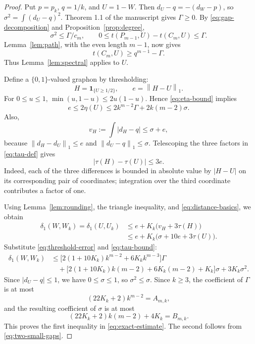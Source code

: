 \documentclass[11pt]{article}
\theoremstyle{remark}
\newcommand{\ind}{\mathbf{1}}
\newcommand{\norm}[1]{\left\lVert #1\right\rVert}
\begin{document}
\begin{proof}
Put $p=p_k$, $q=1/k$, and $U=1-W$.
Then $d_U-q=-(d_W-p)$, so $\sigma^2=\int(d_U-q)^2$.
Theorem 1.1 of the manuscript gives $\Gamma\geq0$.
By \eqref{eq:gap-decomposition} and Proposition~\ref{prop:degree},
\begin{equation}\label{eq:two-small-gaps}
 \sigma^2\leq\Gamma/c_m,
 \qquad 0\leq t(P_{m-1},U)-t(C_m,U)\leq\Gamma.
\end{equation}
Lemma~\ref{lem:path}, with the even length $m-1$, now gives
\[
 t(C_m,U)\geq q^{m-1}-\Gamma.
\]
Thus Lemma~\ref{lem:spectral} applies to $U$.

Define a $\{0,1\}$-valued graphon by thresholding:
\[
 H=\ind_{\{U\geq1/2\}},\qquad e=\norm{H-U}_1.
\]
For $0\leq u\leq1$,
$\min(u,1-u)\leq2u(1-u)$. Hence \eqref{eq:eta-bound} implies
\begin{equation}\label{eq:threshold-error}
 e\leq2\eta(U)
 \leq2k^{m-2}\Gamma+2k(m-2)\sigma.
\end{equation}
Also,
\begin{equation}\label{eq:threshold-degrees}
 v_H:=\int|d_H-q|\leq\sigma+e,
\end{equation}
because $\norm{d_H-d_U}_1\leq e$ and
$\norm{d_U-q}_1\leq\sigma$.
Telescoping the three factors in \eqref{eq:tau-def} gives
\begin{equation}\label{eq:threshold-triples}
 |\tau(H)-\tau(U)|\leq3e.
\end{equation}
Indeed, each of the three differences is bounded in absolute value by
$|H-U|$ on its corresponding pair of coordinates; integration over the
third coordinate contributes a factor of one.

Using Lemma~\ref{lem:rounding}, the triangle inequality, and
\eqref{eq:distance-basics}, we obtain
\begin{align*}
 \delta_1(W,W_k)=\delta_1(U,U_k)
 &\leq e+K_k\bigl(v_H+3\tau(H)\bigr)\\
 &\leq e+K_k\bigl(\sigma+10e+3\tau(U)\bigr).
\end{align*}
Substitute \eqref{eq:threshold-error} and \eqref{eq:tau-bound}:
\begin{align*}
 \delta_1(W,W_k)
 &\leq\bigl[2(1+10K_k)k^{m-2}+6K_k k^{m-3}\bigr]\Gamma\\
 &\quad+\bigl[2(1+10K_k)k(m-2)+6K_k(m-2)+K_k\bigr]\sigma
       +3K_k\sigma^2.
\end{align*}
Since $|d_U-q|\leq1$, we have $0\leq\sigma\leq1$, so
$\sigma^2\leq\sigma$.
Since $k\geq3$, the coefficient of $\Gamma$ is at most
\[
 (22K_k+2)k^{m-2}=A_{m,k},
\]
and the resulting coefficient of $\sigma$ is at most
\[
 (22K_k+2)k(m-2)+4K_k=B_{m,k}.
\]
This proves the first inequality in \eqref{eq:exact-estimate}.
The second follows from \eqref{eq:two-small-gaps}.
\end{proof}
\end{document}
